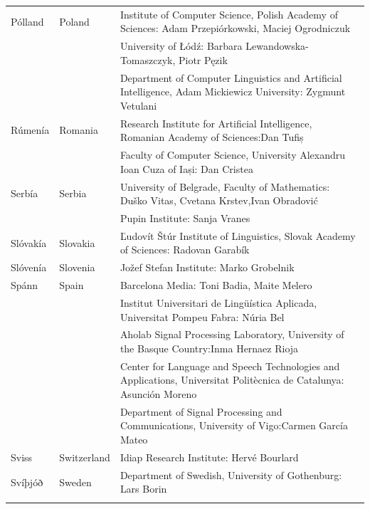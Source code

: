 \begin{longtable}{llp{115mm}}
  Pólland & \textcolor{grey1}{Poland} & Institute of Computer Science, Polish Academy of Sciences: \newline Adam Przepiórkowski, Maciej Ogrodniczuk \\ \addlinespace
  & & University of Łódź: Barbara Lewandowska-Tomaszczyk, Piotr Pęzik\\ \addlinespace
  & & Department of Computer Linguistics and Artificial Intelligence, Adam Mickiewicz University: Zygmunt Vetulani \\ \addlinespace
   Rúmenía & \textcolor{grey1}{Romania} & Research Institute for Artificial Intelligence, Romanian Academy of Sciences:\newline Dan Tufiș \\ \addlinespace
  & & Faculty of Computer Science, University Alexandru Ioan Cuza of Iași: Dan Cristea \\ \addlinespace
  Serbía & \textcolor{grey1}{Serbia} & University of Belgrade, Faculty of Mathematics: Duško Vitas, Cvetana Krstev,\newline Ivan Obradović \\ \addlinespace
  & & Pupin Institute: Sanja Vranes \\ \addlinespace  
  Slóvakía & \textcolor{grey1}{Slovakia} & Ľudovít Štúr Institute of Linguistics, Slovak Academy of Sciences: Radovan Garabík \\ \addlinespace 
  Slóvenía & \textcolor{grey1}{Slovenia} & Jožef Stefan Institute: Marko Grobelnik \\ \addlinespace 
  Spánn & \textcolor{grey1}{Spain} & Barcelona Media: Toni Badia, Maite Melero \\ \addlinespace 
  & & Institut Universitari de Lingüística Aplicada, Universitat Pompeu Fabra: Núria Bel \\ \addlinespace 
  & & Aholab Signal Processing Laboratory, University of the Basque Country:\newline Inma Hernaez Rioja \\ \addlinespace 
  & & Center for Language and Speech Technologies and Applications, Universitat Politècnica de Catalunya:  Asunción Moreno \\ \addlinespace 
  & & Department of Signal Processing and Communications, University of Vigo:\newline Carmen García Mateo \\ \addlinespace 
  Sviss & \textcolor{grey1}{Switzerland} & Idiap Research Institute: Hervé Bourlard \\ \addlinespace 
  Svíþjóð & \textcolor{grey1}{Sweden} & Department of Swedish, University of Gothenburg: Lars Borin \\ \addlinespace 

\end{longtable}
